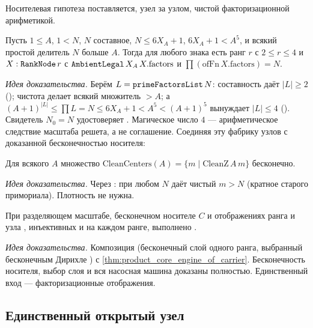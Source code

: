 Носителевая гипотеза поставляется, узел за узлом, чистой факторизационной арифметикой.

\begin{theorem}\label{thm:mkNode_of_composite}
Пусть $1\le A$, $1<N$, $N$ составное, $N\le 6X_A+1$, $6X_A+1<A^5$, и всякий простой делитель $N$
больше $A$. Тогда для любого знака есть ранг $r$ с $2\le r\le4$ и $X:\texttt{RankNode}\,r$ с
$\texttt{AmbientLegal}\,X_A\,X.\mathrm{factors}$ и $\prod(\mathrm{ofFn}\,X.\mathrm{factors})=N$.
\end{theorem}

\emph{Идея доказательства.} Берём $L=\texttt{primeFactorsList}\,N$: составность даёт $|L|\ge2$
(); чистота делает всякий множитель $>A$; а
$(A+1)^{|L|}\le\prod L=N\le 6X_A+1<A^5<(A+1)^5$ вынуждает $|L|\le4$ ().
Свидетель $N_0=N$ удостоверяет . \green{} Магическое число $4$ --- арифметическое
следствие масштаба решета, а не соглашение. Соединяя эту фабрику узлов с доказанной бесконечностью
носителя:

\begin{theorem}\label{thm:cleanCenters_infinite}
Для всякого $A$ множество $\mathrm{CleanCenters}(A)=\{m\mid\mathrm{CleanZ}\,A\,m\}$ бесконечно.
\end{theorem}

\emph{Идея доказательства.} Через : при любом $N$
 даёт чистый $m>N$ (кратное старого примориала). \green{} Плотность не
нужна.

\begin{theorem}\label{thm:engine_of_carrier_and_factorize}
При разделяющем масштабе, бесконечном носителе $C$ и отображениях ранга  и узла
, инъективных и  на каждом ранге, выполнено .
\end{theorem}

\emph{Идея доказательства.} Композиция  (бесконечный слой одного
ранга, выбранный бесконечным Дирихле ) с
\cref{thm:product_core_engine_of_carrier}. \green{} Бесконечность носителя, выбор слоя и вся насосная
машина доказаны полностью. Единственный вход --- факторизационные отображения.

\subsection{Единственный открытый узел}

